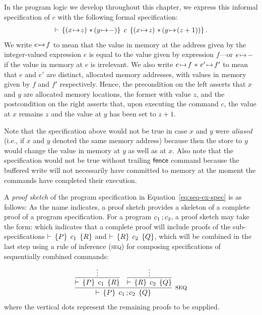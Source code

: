 \documentclass[11pt]{report}
\begin{document}
In the program logic we develop throughout this chapter, we express this informal specification of $c$ with the following formal specification: \begin{align}\label{eq:seq-ex-spec} \triple{(x \fpointsto z) \fsep (y \fpointsto -)}{c}{(x \fpointsto z) \fsep (y \fpointsto (z + 1))}.\end{align}
We write $e \!\mapsto\! f$ to mean that the value in memory at the address given by the integer-valued expression $e$ is equal to the value given by expression $f$---or $e \!\mapsto\! -$ if the value in memory at $e$ is irrelevant. We also write $e \!\mapsto\! f \operatorname{\,\ast\,} e' \!\mapsto\! f'$ to mean that $e$ and $e'$ are distinct, allocated memory addresses, with values in memory given by $f$ and $f'$ respectively. Hence, the precondition on the left asserts that $x$ and $y$ are allocated memory locations, the former with value $z$, and the postcondition on the right asserts that, upon executing the command $c$, the value at $x$ remains $z$ and the value at $y$ has been set to $z+1$. 

Note that the specification above would not be true in case $x$ and $y$ were \emph{aliased} (i.e., if $x$ and $y$ denoted the same memory address) because then the store to $y$ would change the value in memory at $y$ as well as at $x$. Also note that the specification would not be true without trailing $\operatorname{\mathsf{fence}}$ command because the buffered write will not necessarily have committed to memory at the moment the commands have completed their execution. 

A \emph{proof sketch} of the program specification in Equation~\ref{eq:seq-ex-spec} is as follows:
As the name indicates, a proof sketch provides a skeleton of a complete proof of a program specification. For a program $c_1 \operatorname{;} c_2$, a proof sketch may take the form:  which indicates that a complete proof will include proofs of the sub-specifications $\vdash\,\left\lbrace P \right\rbrace\;c_1\;\left\lbrace R \right\rbrace$ and $\vdash\,\left\lbrace R \right\rbrace\;c_2\;\left\lbrace Q \right\rbrace$, which will be combined in the last step using a rule of inference (\textsc{seq}) for composing specifications of sequentially combined commands: 
\[ \infer[{\textsc{seq}}]{\triple{P}{c_1 \opseq c_2}{Q}}{\infer{\triple{P}{c_1}{R}}{\vdots} & \infer{\triple{R}{c_2}{Q}}{\vdots}}\] where the vertical dots represent the remaining proofs to be supplied. 
\end{document}
